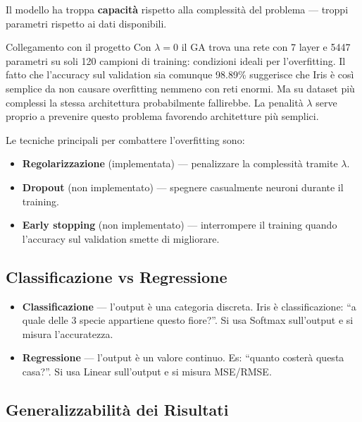 \documentclass[12pt, a4paper]{article}
\begin{document}
\noindent Il modello ha troppa \textbf{capacità} rispetto alla complessità del
problema --- troppi parametri rispetto ai dati disponibili.

\begin{concetto}{Collegamento con il progetto}
Con $\lambda=0$ il GA trova una rete con 7 layer e 5447 parametri su soli
120 campioni di training: condizioni ideali per l'overfitting. Il fatto che
l'accuracy sul validation sia comunque 98.89\% suggerisce che Iris è così
semplice da non causare overfitting nemmeno con reti enormi. Ma su dataset
più complessi la stessa architettura probabilmente fallirebbe.
La penalità $\lambda$ serve proprio a prevenire questo problema favorendo
architetture più semplici.
\end{concetto}

\noindent Le tecniche principali per combattere l'overfitting sono:
\begin{itemize}
    \item \textbf{Regolarizzazione} (implementata) --- penalizzare la
          complessità tramite $\lambda$.
    \item \textbf{Dropout} (non implementato) --- spegnere casualmente neuroni
          durante il training.
    \item \textbf{Early stopping} (non implementato) --- interrompere il
          training quando l'accuracy sul validation smette di migliorare.
\end{itemize}

\subsection{Classificazione vs Regressione}

\begin{itemize}
    \item \textbf{Classificazione} --- l'output è una categoria discreta.
          Iris è classificazione: ``a quale delle 3 specie appartiene questo fiore?''.
          Si usa Softmax sull'output e si misura l'accuratezza.
    \item \textbf{Regressione} --- l'output è un valore continuo.
          Es: ``quanto costerà questa casa?''. Si usa Linear sull'output e
          si misura MSE/RMSE.
\end{itemize}

\subsection{Generalizzabilità dei Risultati}
\end{document}
